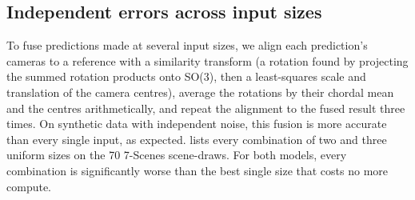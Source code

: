 \documentclass[10pt,twocolumn,letterpaper]{article}
\begin{document}
\subsection{Independent errors across input sizes}
\label{sec:s_ens}
To fuse predictions made at several input sizes, we align each prediction's cameras to a reference with a similarity transform (a rotation found by projecting the summed rotation products onto SO(3), then a least-squares scale and translation of the camera centres), average the rotations by their chordal mean and the centres arithmetically, and repeat the alignment to the fused result three times. On synthetic data with independent noise, this fusion is more accurate than every single input, as expected.  lists every combination of two and three uniform sizes on the 70 7-Scenes scene-draws. For both models, every combination is significantly worse than the best single size that costs no more compute.
\end{document}
